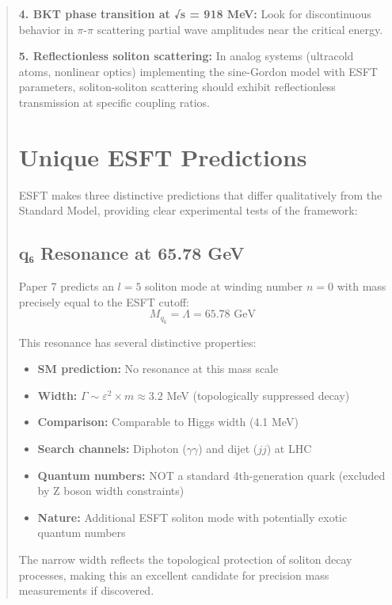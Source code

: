 ﻿\documentclass[twocolumn,prd,amsmath,amssymb,aps]{revtex4-2}
\begin{document}
\begin{abstract}
\textbf{4. BKT phase transition at √s = 918 MeV:}
Look for discontinuous behavior in $\pi$-$\pi$ scattering partial wave amplitudes near the critical energy.

\textbf{5. Reflectionless soliton scattering:}
In analog systems (ultracold atoms, nonlinear optics) implementing the sine-Gordon model with ESFT parameters, soliton-soliton scattering should exhibit reflectionless transmission at specific coupling ratios.

\section{Unique ESFT Predictions}

ESFT makes three distinctive predictions that differ qualitatively from the Standard Model, providing clear experimental tests of the framework:

\subsection{q₆ Resonance at 65.78 GeV}

Paper 7 predicts an $l=5$ soliton mode at winding number $n=0$ with mass precisely equal to the ESFT cutoff:
\begin{equation}
M_{q_6} = \Lambda = 65.78 \text{ GeV}
\end{equation}

This resonance has several distinctive properties:
\begin{itemize}
\item \textbf{SM prediction:} No resonance at this mass scale
\item \textbf{Width:} $\Gamma \sim \varepsilon^2 \times m \approx 3.2$ MeV (topologically suppressed decay)
\item \textbf{Comparison:} Comparable to Higgs width (4.1 MeV)
\item \textbf{Search channels:} Diphoton ($\gamma\gamma$) and dijet ($jj$) at LHC
\item \textbf{Quantum numbers:} NOT a standard 4th-generation quark (excluded by Z boson width constraints)
\item \textbf{Nature:} Additional ESFT soliton mode with potentially exotic quantum numbers
\end{itemize}

The narrow width reflects the topological protection of soliton decay processes, making this an excellent candidate for precision mass measurements if discovered.


\end{abstract}
\end{document}
